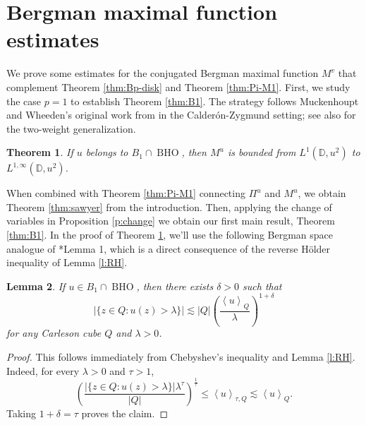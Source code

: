 \documentclass{amsart}
\newcommand{\avg}[1]{\left\langle {#1}\right\rangle}
\newtheorem{theorem}{Theorem}[section]
\newtheorem{lemma}[theorem]{Lemma}
\theoremstyle{definition}
\numberwithin{equation}{section}
\newcommand{\Mv}{M^v}
\DeclareMathOperator{\BHO}{BHO}
\begin{document}
\section{Bergman maximal function estimates}\label{s:max}
We prove some estimates for the conjugated Bergman maximal function $\Mv$ that complement Theorem \ref{thm:Bp-disk} and Theorem \ref{thm:Pi-M1}.
First, we study the case $p=1$ to establish Theorem \ref{thm:B1}. The strategy follows Muckenhoupt and Wheeden's original work from \cite{MW77} in the Calder\'on-Zygmund setting; see also \cite{CUMP05} for the two-weight generalization.
\begin{theorem}\label{thm:max-1} If $u$ belongs to $B_1 \cap \BHO$, then $M^u$ is bounded from $L^1(\mathbb{D}, u^2)$ to $L^{1,\infty}(\mathbb{D},u^2)$.
\end{theorem}
When combined with Theorem \ref{thm:Pi-M1} connecting $\Pi^u$ and $M^u$, we obtain Theorem \ref{thm:sawyer} from the introduction. Then, applying the change of variables in Proposition \ref{p:change} we obtain our first main result, Theorem \ref{thm:B1}. In the proof of Theorem \ref{thm:max-1}, we'll use the following Bergman space analogue of \cite{MW77}*{Lemma 1}, which is a direct consequence of the reverse H\"older inequality of Lemma \ref{l:RH}. 
\begin{lemma}\label{lem:b1}
    If $u \in B_1\cap \BHO$, then there exists $\delta>0$ such that 
    \[
        |\{ z \in Q\colon u(z) > \lambda \}| \lesssim |Q|\left( \frac{\avg{u}_Q}{\lambda}\right)^{1 + \delta}
    \]
    for any Carleson cube $Q$ and $\lambda > 0$.
\end{lemma}
\begin{proof}
This follows immediately from Chebyshev's inequality and Lemma \ref{l:RH}. Indeed, for every $\lambda>0$ and $\tau>1$,
	\[ \left( \frac{| \{ z \in Q \colon u(z) > \lambda\} |\lambda^\tau}{|Q|} \right)^{\frac{1}{\tau}}  \le \avg{u}_{\tau,Q} \lesssim \avg{u}_Q.\]
Taking $1+\delta=\tau$ proves the claim.
\end{proof}
\end{document}

